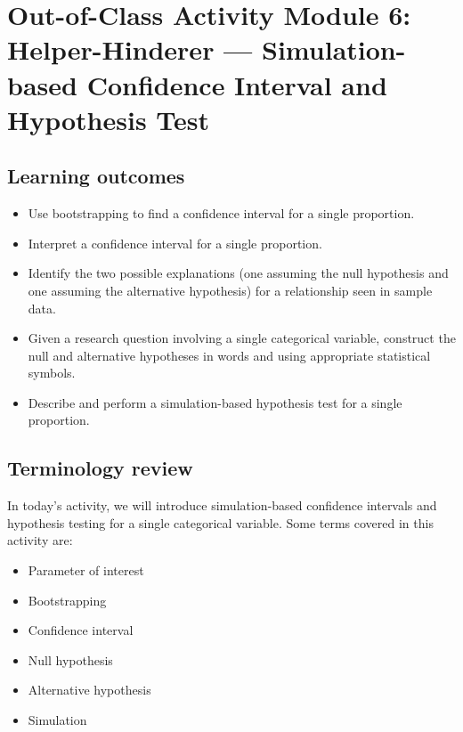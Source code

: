 \documentclass[
]{report}
\begin{document}
\hypertarget{out-of-class-activity-module-6-helper-hinderer-simulation-based-confidence-interval-and-hypothesis-test}{%
\section{Out-of-Class Activity Module 6: Helper-Hinderer --- Simulation-based Confidence Interval and Hypothesis Test}\label{out-of-class-activity-module-6-helper-hinderer-simulation-based-confidence-interval-and-hypothesis-test}}


\hypertarget{learning-outcomes-10}{%
\subsection{Learning outcomes}\label{learning-outcomes-10}}

\begin{itemize}
\item
  Use bootstrapping to find a confidence interval for a single proportion.
\item
  Interpret a confidence interval for a single proportion.
\item
  Identify the two possible explanations (one assuming the null hypothesis and one assuming the alternative hypothesis) for a relationship seen in sample data.
\item
  Given a research question involving a single categorical variable, construct the null and alternative hypotheses
  in words and using appropriate statistical symbols.
\item
  Describe and perform a simulation-based hypothesis test for a single proportion.
\end{itemize}

\hypertarget{terminology-review-9}{%
\subsection{Terminology review}\label{terminology-review-9}}

In today's activity, we will introduce simulation-based confidence intervals and hypothesis testing for a single categorical variable. Some terms covered in this activity are:

\begin{itemize}
\item
  Parameter of interest
\item
  Bootstrapping
\item
  Confidence interval
\item
  Null hypothesis
\item
  Alternative hypothesis
\item
  Simulation
\end{itemize}
\end{document}
